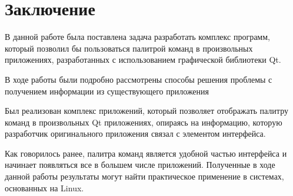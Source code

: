 \chapter*{Заключение}

В данной работе была поставлена задача разработать комплекс программ, который
позволил бы пользоваться палитрой команд в произвольных приложениях,
разработанных с использованием графической библиотеки Qt.

В ходе работы были подробно рассмотрены способы решения проблемы с получением
информации из существующего приложения

Был реализован комплекс приложений, который позволяет отображать палитру команд
в произвольных Qt приложениях, опираясь на информацию, которую разработчик
оригинального приложения связал с элементом интерфейса.

Как говорилось ранее, палитра команд является удобной частью интерфейса и
начинает появляться все в большем числе приложений. Полученные в ходе данной
работы результаты могут найти практическое применение в системах, основанных на
Linux.
